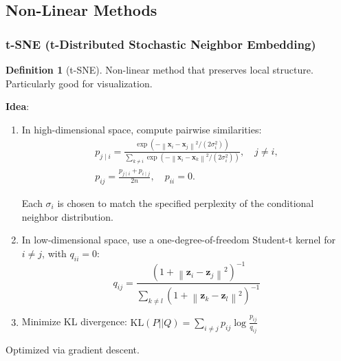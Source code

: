 \documentclass[11pt,twoside]{article}
\numberwithin{equation}{section}
\newcommand{\vect}[1]{\bm{#1}}
\newcommand{\norm}[1]{\left\lVert#1\right\rVert}
\theoremstyle{plain}
\theoremstyle{definition}
\newtheorem{definition}[theorem]{Definition}
\theoremstyle{remark}
\begin{document}
\subsection{Non-Linear Methods}

\subsubsection{t-SNE (t-Distributed Stochastic Neighbor Embedding)}

\begin{definition}[t-SNE]
Non-linear method that preserves local structure. Particularly good for visualization.

\textbf{Idea}:
\begin{enumerate}
\item In high-dimensional space, compute pairwise similarities:
\[
\begin{gathered}
p_{j\mid i}=\frac{\exp(-\norm{\vect{x}_i-\vect{x}_j}^2/(2\sigma_i^2))}{\sum_{k\neq i}\exp(-\norm{\vect{x}_i-\vect{x}_k}^2/(2\sigma_i^2))},\quad j\neq i,\\
p_{ij}=\frac{p_{j\mid i}+p_{i\mid j}}{2n},\quad p_{ii}=0.
\end{gathered}
\]

Each $\sigma_i$ is chosen to match the specified perplexity of the conditional neighbor distribution.

\item In low-dimensional space, use a one-degree-of-freedom Student-t kernel for $i\neq j$, with $q_{ii}=0$:
\[
q_{ij} = \frac{(1 + \norm{\vect{z}_i - \vect{z}_j}^2)^{-1}}{\sum_{k \neq l} (1 + \norm{\vect{z}_k - \vect{z}_l}^2)^{-1}}
\]

\item Minimize KL divergence: $\text{KL}(P||Q) = \sum_{i\neq j} p_{ij}\log\frac{p_{ij}}{q_{ij}}$
\end{enumerate}

Optimized via gradient descent.
\end{definition}
\end{document}
